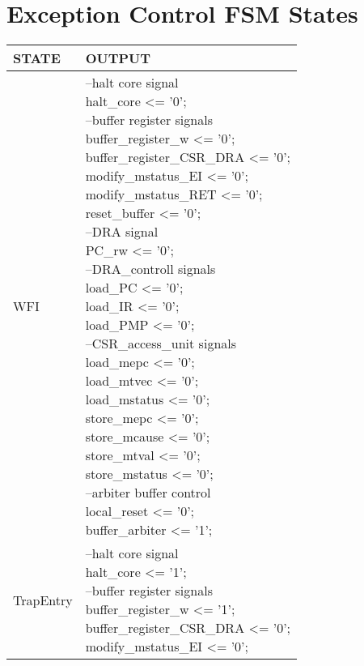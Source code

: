 
\addchap{\appendixPhrase}
\section{Exception Control FSM States}
\begin{longtable}{| p{} | p{} |}
		\hline
		\rowcolor{light-gray}
		\textbf{STATE} & \textbf{OUTPUT} \\
		\hline
		WFI & \makecell{--halt core signal\\
		halt\_core <= '0';\\
		--buffer register signals\\
		buffer\_register\_w <= '0';\\
		buffer\_register\_CSR\_DRA <= '0';\\
		modify\_mstatus\_EI <= '0';\\
		modify\_mstatus\_RET <= '0';\\
		reset\_buffer <= '0';\\
		--DRA signal\\
		PC\_rw <= '0';\\
		--DRA\_controll signals\\
		load\_PC <= '0';\\
		load\_IR <= '0';\\
		load\_PMP <= '0';\\
		--CSR\_access\_unit signals\\
		load\_mepc <= '0';\\
		load\_mtvec <= '0';\\
		load\_mstatus <= '0';\\
		store\_mepc <= '0';\\
		store\_mcause <= '0';\\
		store\_mtval <= '0';\\
		store\_mstatus <= '0';\\
		--arbiter buffer control\\
		local\_reset <= '0';\\
		buffer\_arbiter <= '1';}\\
		\hline
				TrapEntry & \makecell{--halt core signal\\
			halt\_core <= '1';\\
			--buffer register signals\\
			buffer\_register\_w <= '1';\\
			buffer\_register\_CSR\_DRA <= '0';\\
			modify\_mstatus\_EI <= '0';\\
}
\end{longtable}
